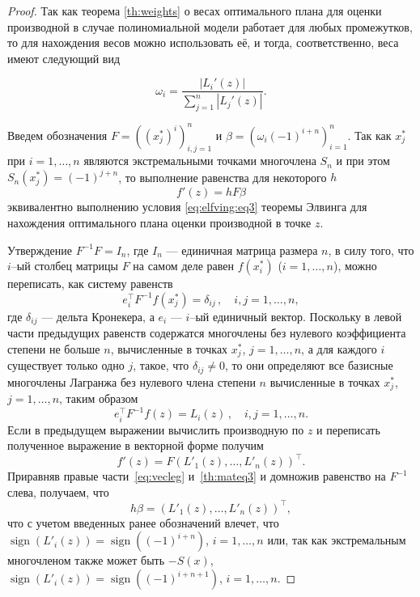 \documentclass[specialist,
               substylefile = spbu.rtx,
               subf,href,colorlinks=true, 12pt]{disser}
\theoremstyle{definition}
\DeclareMathOperator*{\sign}{sign}
\newcommand\abs[1]{\left\lvert#1\right\rvert}
\begin{document}
\begin{proof}
	Так как теорема \ref{th:weights} о весах оптимального плана для оценки производной в случае полиномиальной модели работает для любых промежутков, то для нахождения весов можно использовать её, и тогда, соответственно, веса имеют следующий вид
	
	\begin{equation*}
		\omega_i = \frac{\abs{L_i'(z)}}{\sum_{j=1}^n \abs{L_j'(z)}}.
	\end{equation*}
	
	Введем обозначения $F = \left((x_j^*)^i\right)^n_{i, j = 1}$ и $\beta = \left( \omega_i (-1)^{i+n} \right)_{i=1}^n$. Так как $x_j^*$ при $i = 1, \ldots , n$ являются экстремальными точками многочлена $S_n$ и при этом $S_n(x_j^*) = (-1)^{j+n}$, то выполнение равенства для некоторого $h$
	\begin{equation}
		\label{th:mateq3}
		f'(z) = hF\beta
	\end{equation}
	 эквивалентно выполнению условия \eqref{eq:elfving:eq3} теоремы Элвинга для нахождения оптимального плана оценки производной в точке $z$.
	 
	Утверждение $F^{-1}F = I_n$, где $I_n$ --- единичная матрица размера $n$, в силу того, что $i$--ый столбец матрицы $F$ на самом деле равен $f(x_i^*)$ ($i = 1, \ldots, n$), можно переписать, как систему равенств
	\begin{equation*}
		e_i^{\top} F^{-1} f(x_j^*) = \delta_{ij} \, , \quad i, j = 1, \ldots , n ,
	\end{equation*}
	где $\delta_{ij}$ --- дельта Кронекера, а $e_i$ --- $i$--ый единичный вектор. Поскольку в левой части предыдущих равенств содержатся многочлены без нулевого коэффициента степени не больше $n$, вычисленные в точках $x_j^*$, $j=1, \ldots , n$, а для каждого $i$ существует только одно $j$, такое, что $\delta_{ij} \neq 0$, то они определяют все базисные многочлены Лагранжа без нулевого члена степени $n$ вычисленные в точках $x_j^*$, $j=1, \ldots , n$, таким образом
	\begin{equation*}
		e_i^{\top} F^{-1} f(z) = L_i(z) \, , \quad i, j = 1, \ldots , n .
	\end{equation*}
	Если в предыдущем выражении вычислить производную по $z$ и переписать полученное выражение в векторной форме получим
	\begin{equation}
		\label{eq:vecleg}
		f'(z) = F \left( L'_1(z), \ldots, L'_n(z) \right)^\top.
	\end{equation}
	Приравняв правые части~\eqref{eq:vecleg} и~\eqref{th:mateq3} и домножив равенство на $F^{-1}$ слева, получаем, что
	\begin{equation*}
		h \beta = \left( L'_1(z), \ldots, L'_n(z) \right)^\top,
	\end{equation*}
	что с учетом введенных ранее обозначений влечет, что $\sign (L'_i(z)) = \sign((-1)^{i+n}) $, $i = 1, \ldots, n$ или, так как экстремальным многочленом также может быть $-S(x)$,  $\sign (L'_i(z)) = \sign((-1)^{i+n+1}) $, $i = 1, \ldots, n$.
	

\end{proof}
\end{document}
